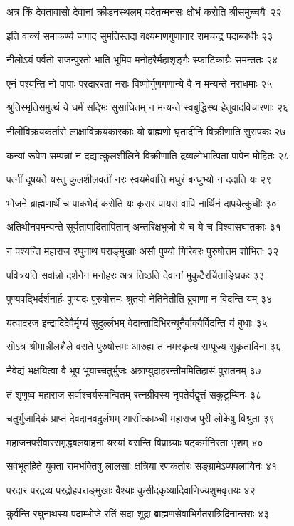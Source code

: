 अत्र किं देवतावासो देवानां क्रीडनस्थलम्
यदेतन्मनसः क्षोभं करोति श्रीसमुच्चयैः २२

इति वाक्यं समाकर्ण्य जगाद सुमतिस्तदा
वक्ष्यमाणगुणागार रामचन्द्र पदाब्जधीः २३

नीलोऽयं पर्वतो राजन्पुरतो भाति भूमिप
मनोहरैर्महाशृङ्गैः स्फाटिकाग्रैः समन्ततः २४

एनं पश्यन्ति नो पापाः परदाररता नराः
विष्णोर्गुणगणान्ये वै न मन्यन्ते नराधमाः २५

श्रुतिस्मृतिसमुत्थं ये धर्मं सद्भिः सुसाधितम्
न मन्यन्ते स्वबुद्धिस्थ हेतुवादविचारणाः २६

नीलीविक्रयकर्तारो लाक्षाविक्रयकारकाः
यो ब्राह्मणो घृतादीनि विक्रीणाति सुरापकः २७

कन्यां रूपेण सम्पन्नां न दद्यात्कुलशीलिने
विक्रीणाति द्रव्यलोभात्पिता पापेन मोहितः २८

पत्नीं दूषयते यस्तु कुलशीलवतीं नरः
स्वयमेवात्ति मधुरं बन्धुभ्यो न ददाति यः २९

भोजने ब्राह्मणार्थे च पाकभेदं करोति यः
कृसरं पायसं वापि नार्थिनं दापयेत्कुधीः ३०

अतिथीनवमन्यन्ते सूर्यतापादितापितान्
अन्तरिक्षभुजो ये च ये च विश्वासघातकाः ३१

न पश्यन्ति महाराज रघुनाथ पराङ्मुखाः
असौ पुण्यो गिरिवरः पुरुषोत्तम शोभितः ३२

पवित्रयति सर्वान्नो दर्शनेन मनोहरः
अत्र तिष्ठति देवानां मुकुटैरर्चिताङ्घ्रिकः ३३

पुण्यवद्भिर्दर्शनार्हः पुण्यदः पुरुषोत्तमः
श्रुतयो नेतिनेतीति ब्रुवाणा न विदन्ति यम् ३४

यत्पादरज इन्द्रादिदेवैर्मृग्यं सुदुर्ल्लभम्
वेदान्तादिभिरन्यूनैर्वाक्यैर्विदन्ति यं बुधाः ३५

सोऽत्र श्रीमान्नीलशैले वसते पुरुषोत्तमः
आरुह्य तं नमस्कृत्य सम्पूज्य सुकृतादिना ३६

नैवेद्यं भक्षयित्वा वै भूप भूयाच्चतुर्भुजः
अत्राप्युदाहरन्तीममितिहासं पुरातनम् ३७

तं शृणुष्व महाराज सर्वाश्चर्यसमन्वितम्
रत्नग्रीवस्य नृपतेर्यद्वृत्तं सकुटुम्बिनः ३८

चतुर्भुजादिकं प्राप्तं देवदानवदुर्लभम्
आसीत्काञ्ची महाराज पुरी लोकेषु विश्रुता ३९

महाजनपरीवारसमृद्धबलवाहना
यस्यां वसन्ति विप्राग्र्याः षट्कर्मनिरता भृशम् ४०

सर्वभूतहिते युक्ता रामभक्तिषु लालसाः
क्षत्रिया रणकर्तारः सङ्ग्रामेऽप्यपलायिनः ४१

परदार परद्रव्य परद्रोहपराङ्मुखाः
वैश्याः कुसीदकृष्यादिवाणिज्यशुभवृत्तयः ४२

कुर्वन्ति रघुनाथस्य पदाम्भोजे रतिं सदा
शूद्रा ब्राह्मणसेवाभिर्गतरात्रिदिनान्तराः ४३

